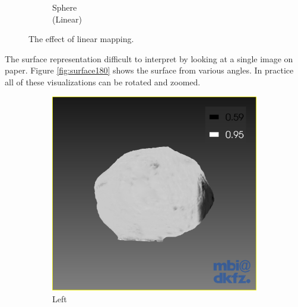 \begin{figure}[H]
\begin{subfigure}[b]{0.25\textwidth}
    \caption*{Sphere\\(Linear)}
    \label{fig:surfacesurfacescaling}
  \end{subfigure}
  \caption{The effect of linear mapping.}\label{fig:surfacescaling}
\end{figure}

The surface representation difficult to interpret by looking at a single image on paper. Figure \ref{fig:surface180} shows the surface from various angles. In practice all of these visualizations can be rotated and zoomed.

\begin{figure}[h]
  \centering
  \begin{subfigure}[b]{0.20\textwidth}
    \includegraphics[width=\textwidth]{images/surface/surface_180_1.png}
    \caption*{Left}
    \label{fig:surface_left}
  \end{subfigure}%
  \begin{subfigure}[b]{0.20\textwidth}

\end{subfigure}
\end{figure}
